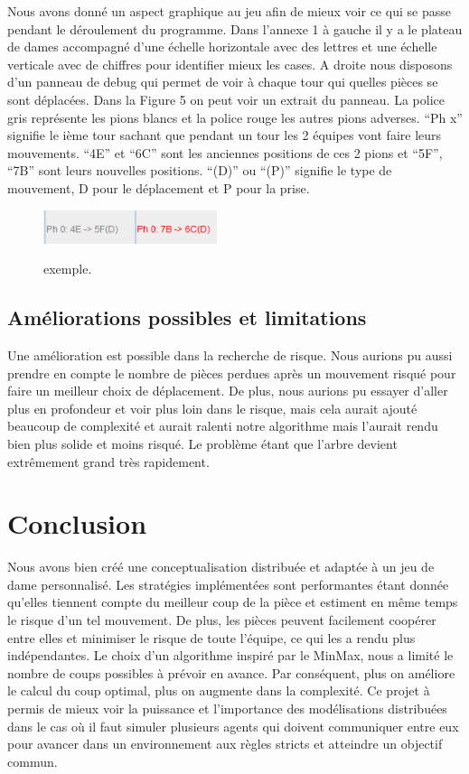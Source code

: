 \documentclass[11pt]{article} %
\begin{document}
Nous avons donné un aspect graphique au jeu afin de mieux voir ce qui se passe pendant le déroulement du programme. Dans l’annexe 1 à gauche il y a le plateau de dames accompagné d’une échelle horizontale avec des lettres et une échelle verticale avec de chiffres pour identifier mieux les cases. 
A droite nous disposons d’un panneau de debug qui permet de voir à chaque tour qui quelles pièces se sont déplacées. Dans la Figure 5 on peut voir un extrait du panneau. La police gris représente les pions blancs et la police rouge les autres pions adverses. “Ph x” signifie le ième tour sachant que pendant un tour les 2 équipes vont faire leurs mouvements. “4E” et “6C” sont les anciennes positions de ces 2 pions et  “5F”, “7B” sont leurs nouvelles positions. “(D)” ou “(P)” signifie le type de mouvement, D pour le déplacement et P pour la prise.

\begin{figure}[!ht]
\caption{exemple.}
\label{fig_sim}
\centering
{
\includegraphics[width=2in]{6}
\label{paysage}
}
\end{figure}

\subsection{Améliorations possibles et limitations}
Une amélioration est possible dans la recherche de risque. Nous aurions pu aussi prendre en compte le nombre de pièces perdues après un mouvement risqué pour faire un meilleur choix de déplacement.
De plus, nous aurions pu essayer d'aller plus en profondeur et voir plus loin dans le risque, mais cela aurait ajouté beaucoup de complexité et aurait ralenti notre algorithme mais l'aurait rendu bien plus solide et moins risqué. Le problème étant que l'arbre devient extrêmement grand très rapidement.



\section{Conclusion}

Nous avons bien créé une conceptualisation distribuée et adaptée à un jeu de dame personnalisé. Les stratégies implémentées sont performantes étant donnée qu’elles tiennent compte du meilleur coup de la pièce et estiment en même temps le risque d’un tel mouvement. De plus, les pièces peuvent facilement coopérer entre elles et minimiser le risque de toute l’équipe, ce qui les a rendu plus indépendantes.
Le choix d’un algorithme inspiré par le MinMax, nous a limité le nombre de coups possibles à prévoir en avance. Par conséquent, plus on améliore le calcul du coup optimal, plus on augmente dans la complexité.
Ce projet à permis de mieux voir la puissance et l'importance des modélisations distribuées dans le cas où il faut simuler plusieurs agents qui doivent communiquer entre eux pour avancer dans un environnement aux règles stricts et atteindre un objectif commun.
\end{document}
